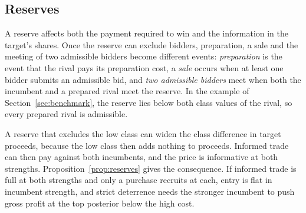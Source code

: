 \subsection{Reserves}\label{sec:reserves}

A reserve affects both the payment required to win and the information in the target's shares. Once the reserve can
exclude bidders, preparation, a sale and the meeting of two admissible bidders become different events:
\emph{preparation} is the event that the rival pays its preparation cost, a \emph{sale} occurs when at
least one bidder submits an admissible bid, and \emph{two admissible bidders} meet when both the incumbent
and a prepared rival meet the reserve. In the example of Section~\ref{sec:benchmark},
the reserve lies below both class values of the rival, so every prepared rival is admissible.

A reserve that excludes the low class can widen the class difference in target proceeds, because the low class then
adds nothing to proceeds. Informed trade can then pay against both incumbents, and the price is informative at both
strengths. Proposition~\ref{prop:reserves} gives the consequence. If informed trade is full at both strengths and only a purchase recruits at each,
entry is flat in incumbent strength, and strict deterrence needs the stronger incumbent to push gross profit at the
top posterior below the high cost.

